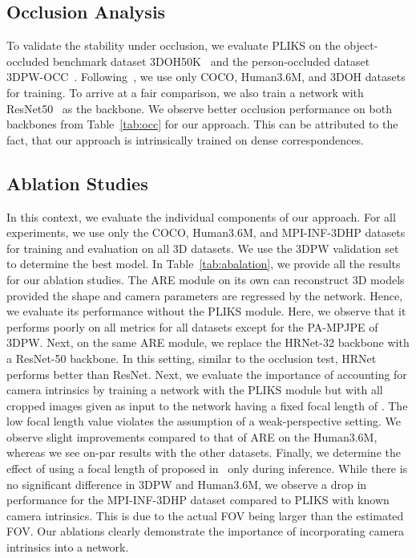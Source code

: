 \documentclass[10pt,twocolumn,letterpaper]{article}
\begin{document}
\subsection{Occlusion Analysis}
To validate the stability under occlusion, we evaluate PLIKS on the object-occluded benchmark dataset 3DOH50K~\cite{3doh} and the person-occluded dataset 3DPW-OCC~\cite{3dpw}. Following~\cite{pare}, we use only COCO, Human3.6M, and 3DOH datasets for training. To arrive at a fair comparison, we also train a network with ResNet50~\cite{r50} as the backbone. We observe better occlusion performance on both backbones from Table~\ref{tab:occ} for our approach. This can be attributed to the fact, that our approach is intrinsically trained on dense correspondences. 



\subsection{Ablation Studies}
In this context, we evaluate the individual components of our approach. For all experiments, we use only the COCO, Human3.6M, and MPI-INF-3DHP datasets for training and evaluation on all 3D datasets. We use the 3DPW validation set to determine the best model. In Table~\ref{tab:abalation}, we provide all the results for our ablation studies. The ARE module on its own can reconstruct 3D models provided the shape and camera parameters are regressed by the network. Hence, we evaluate its performance without the PLIKS module. Here, we observe that it performs poorly on all metrics for all datasets except for the PA-MPJPE of 3DPW. Next, on the same ARE module, we replace the HRNet-32 backbone with a ResNet-50 backbone. In this setting, similar to the occlusion test,
HRNet performs better than ResNet. Next, we evaluate the importance of accounting for camera intrinsics by training a network with the PLIKS module but with all cropped images given as input to the network having a fixed focal length of . The low focal length value violates the assumption of a weak-perspective setting. We observe slight improvements compared to that of  ARE on the Human3.6M, whereas we see on-par results with the other datasets.  Finally, we determine the effect of using a focal length of  proposed in~\cite{wpc} only during inference. While there is no significant difference in 3DPW and Human3.6M, we observe a drop in performance for the MPI-INF-3DHP dataset compared to PLIKS with known camera intrinsics. This is due to the actual FOV being larger than the estimated FOV. Our ablations clearly demonstrate the importance of incorporating camera intrinsics into a network. 
\end{document}
